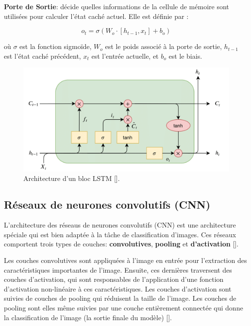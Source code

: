 \textbf{Porte de Sortie}: décide quelles informations de la cellule de mémoire sont utilisées pour calculer l'état caché actuel. Elle est définie par :

\begin{equation}
	o_t = \sigma(W_o \cdot [h_{t-1}, x_t] + b_o)
\end{equation}

où $\sigma$ est la fonction sigmoïde, $W_o$ est le poids associé à la porte de
sortie, $h_{t-1}$ est l'état caché précédent, $x_t$ est l'entrée actuelle, et
$b_o$ est le biais.

\begin{figure}[hbt!]
	\centering
	\includegraphics[width=15cm]{images_pfe/lstm.png}
	\caption{Architecture d'un bloc LSTM [\cite{fawaz2019long}].}
	\label{fig:lstm}
\end{figure}
\FloatBarrier
\medskip

\subsection{Réseaux de neurones convolutifs (CNN)}
L'architecture des réseaus de neurones convolutifs (CNN) est une architecture
spéciale qui est bien adaptée à la tâche de classification d'images. Ces
réseaux comportent trois types de couches: \textbf{convolutives},
\textbf{pooling} et \textbf{d'activation} [\cite{Goodfellow-et-al-2016}].

Les couches convolutives sont appliquées à l'image en entrée pour l’extraction
des caractéristiques importantes de l'image. Ensuite, ces dernières traversent
des couches d'activation, qui sont responsables de l'application d'une fonction
d'activation non-linéaire à ces caractéristiques. Les couches d'activation sont
suivies de couches de pooling qui réduisent la taille de l'image. Les couches
de pooling sont elles même suivies par une couche entièrement connectée qui
donne la classification de l'image (la sortie finale du modèle)
[\cite{Goodfellow-et-al-2016}].

